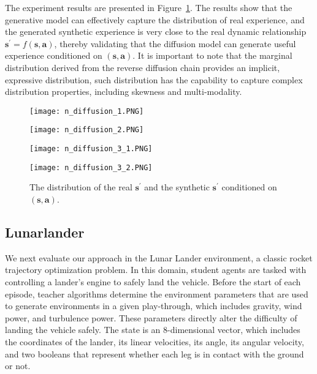\documentclass{article}
\newcommand\va{\bm{a}}
\newcommand\vs{\bm{s}}
\begin{document}
The experiment results are presented in Figure~\ref{fig:diffusion}. The results show that the generative model can effectively capture the distribution of real experience, and the generated synthetic experience is very close to the real  dynamic relationship $\vs^\prime=f(\vs,\va)$, thereby validating that the diffusion model can generate useful experience conditioned on $(\vs,\va)$. It is important to note that the marginal distribution derived from the reverse diffusion chain provides an implicit, expressive distribution, such distribution has the capability to capture complex distribution properties, including skewness and multi-modality.



\begin{figure}[t]
    \centering
    \begin{minipage}[b]{0.245\textwidth}
        \texttt{[image: n\_diffusion\_1.PNG]}
    \end{minipage}
    \hfill
    \begin{minipage}[b]{0.245\textwidth}
        \texttt{[image: n\_diffusion\_2.PNG]}
    \end{minipage}
    \hfill
    \begin{minipage}[b]{0.245\textwidth}
    \texttt{[image: n\_diffusion\_3\_1.PNG]}
    \end{minipage}
    \hfill
    \begin{minipage}[b]{0.245\textwidth}
    \texttt{[image: n\_diffusion\_3\_2.PNG]}
    \end{minipage}
    \caption{The distribution of the real $\vs^\prime$ and the synthetic $\vs^\prime$ conditioned on $(\vs,\va)$.}
    \label{fig:diffusion}
\end{figure}


\subsection{Lunarlander}

We next evaluate our approach in the Lunar Lander environment, a classic rocket trajectory optimization problem. In this domain, student agents are tasked with controlling a lander's engine to safely land the vehicle. Before the start of each episode, teacher algorithms determine the environment parameters that are used to generate environments in a given play-through, which includes gravity, wind power, and turbulence power. These parameters directly alter the difficulty of landing the vehicle safely.
The state is an 8-dimensional vector, which includes the coordinates of the lander, its linear velocities, its angle, its angular velocity, and two booleans that represent whether each leg is in contact with the ground or not.
\end{document}
